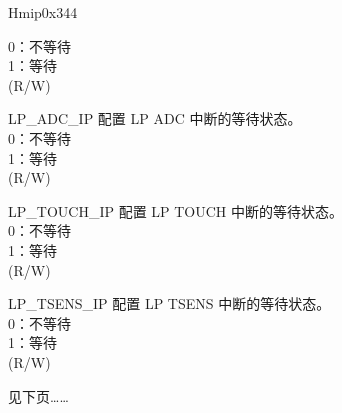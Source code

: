 \begin{register}{H}{mip}{0x344}
\begin{regdesc}
\begin{reglist}
0：不等待\\
1：等待\\(R/W)
\label{fielddesc:LPMIPADCIP}\item [LP\_ADC\_IP] 配置 LP ADC 中断的等待状态。\\
0：不等待\\
1：等待\\(R/W)
\label{fielddesc:LPMIPTOUCHIP}\item [LP\_TOUCH\_IP] 配置 LP TOUCH 中断的等待状态。\\
0：不等待\\
1：等待\\(R/W)
\label{fielddesc:LPMIPTSENSIP}\item [LP\_TSENS\_IP] 配置 LP TSENS 中断的等待状态。\\
0：不等待\\
1：等待\\(R/W)
\item [见下页……]
\end{reglist}\end{regdesc}
\end{register}
\addtocounter{Regfloat}{-1}
